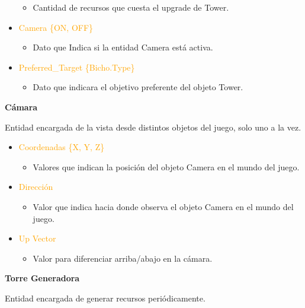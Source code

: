 \documentclass{article}
\begin{document}
\begin{itemize}
\begin{itemize}
        \item Cantidad de recursos que cuesta el upgrade de Tower.
    \end{itemize}
    \item \textcolor{Orange}{Camera \{ON, OFF\}}
    \begin{itemize}
        \item Dato que Indica si la entidad Camera está activa.
    \end{itemize}
    \item \textcolor{Orange}{Preferred\_Target \{Bicho.Type\}}
    \begin{itemize}
        \item Dato que indicara el objetivo preferente del objeto Tower.
    \end{itemize}
\end{itemize}

\noindent \textbf{Cámara}

\hfill \break \noindent Entidad encargada de la vista desde distintos objetos del juego, solo uno a la vez.

\begin{itemize}
    \item \textcolor{Orange}{Coordenadas \{X, Y, Z\}}
    \begin{itemize}
        \item Valores que indican la posición del objeto Camera en el mundo del juego.
    \end{itemize}
    \item \textcolor{Orange}{Dirección}
    \begin{itemize}
        \item Valor que indica hacia donde observa el objeto Camera en el mundo del juego.
    \end{itemize}
        \item \textcolor{Orange}{Up Vector}
    \begin{itemize}
        \item Valor para diferenciar arriba/abajo en la cámara.
    \end{itemize}
\end{itemize}

\noindent \textbf{Torre Generadora}

\hfill \break \noindent Entidad encargada de generar recursos periódicamente.
\end{document}
